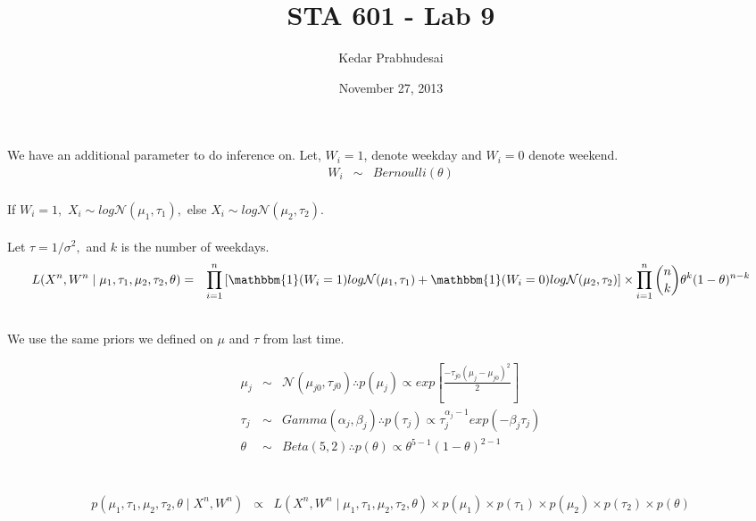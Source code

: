 \documentclass{article}
\title{STA 601 - Lab 9}
\author{Kedar Prabhudesai}
\date{November 27, 2013}
\begin{document}
\maketitle

We have an additional parameter to do inference on. Let, $W_i = 1$, denote weekday and $W_i = 0$ denote weekend. 
\begin{eqnarray*}
W_i &\sim& Bernoulli(\theta)\\
\end{eqnarray*}

If $W_i = 1,$ $X_i \sim log\mathcal{N}(\mu_1,\tau_1),$ else $X_i \sim log\mathcal{N}(\mu_2,\tau_2).$\\

\\

Let $\tau = 1/\sigma^2,$ and $k$ is the number of weekdays. 
\begin{eqnarray*}
L(X^n,W^n \mid \mu_1,\tau_1,\mu_2,\tau_2,\theta) &=& \prod_{i=1}^{n}{\left[\mathbbm{1}(W_i = 1)log\mathcal{N}(\mu_1,\tau_1) + \mathbbm{1}(W_i = 0)log\mathcal{N}(\mu_2,\tau_2)\right]} \times \prod_{i=1}^{n}{\binom{n}{k}\theta^k(1-\theta)^{n-k}}\\
\end{eqnarray*}

\\

We use the same priors we defined on $\mu$ and $\tau$ from last time. 

\begin{eqnarray*}
\mu_j &\sim& \mathcal{N}(\mu_{j0},\tau_{j0})
\therefore p(\mu_j) \propto exp\left[\frac{-\tau_{j0}(\mu_j-\mu_{j0})^2}{2}\right]\\
\tau_j &\sim& Gamma(\alpha_j,\beta_j)
\therefore p(\tau_j) \propto \tau_j^{\alpha_j-1}exp(-\beta_j\tau_j)\\
\theta &\sim& Beta(5,2)
\therefore p(\theta) \propto \theta^{5-1}(1-\theta)^{2-1}\\
\end{eqnarray*}

\\
\begin{eqnarray*}
p(\mu_1,\tau_1,\mu_2,\tau_2,\theta \mid X^n,W^n) &\propto& L(X^n,W^n \mid \mu_1,\tau_1,\mu_2,\tau_2,\theta) \times p(\mu_1) \times p(\tau_1) \times p(\mu_2) \times p(\tau_2) \times p(\theta)\\
\end{eqnarray*}
\end{document}
